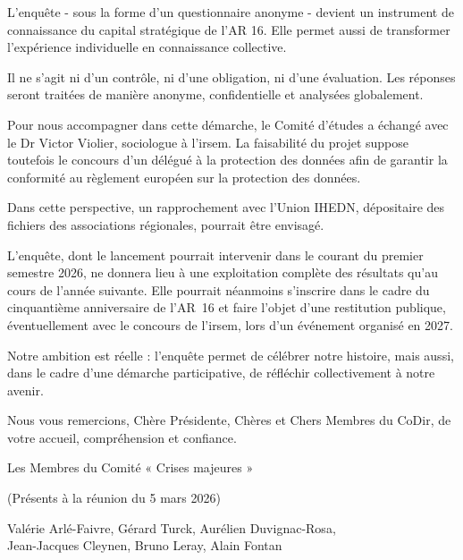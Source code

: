 \begin{tcolorbox}[
breakable,
colback=gray!5,
colframe=black,
boxrule=0.5pt,
arc=3mm
]
L'enquête - sous la forme d'un questionnaire anonyme - devient un instrument de connaissance du capital stratégique de l'AR 16. Elle permet aussi de transformer l'expérience individuelle en connaissance collective.

Il ne s'agit ni d'un contrôle, ni d'une obligation, ni d'une évaluation. Les réponses seront traitées de manière anonyme, confidentielle et analysées globalement.

Pour nous accompagner dans cette démarche, le Comité d'études a échangé avec le Dr Victor Violier, sociologue à l'\gls{irsem}. La faisabilité du projet suppose toutefois le concours d'un délégué à la protection des données afin de garantir la conformité au règlement européen sur la protection des données.

Dans cette perspective, un rapprochement avec l'Union IHEDN, dépositaire des fichiers des associations régionales, pourrait être envisagé.

L'enquête, dont le lancement pourrait intervenir dans le courant du premier semestre 2026, ne donnera lieu à une exploitation complète des résultats qu'au cours de l'année suivante. Elle pourrait néanmoins s'inscrire dans le cadre du cinquantième anniversaire de l'AR~16 et faire l'objet d'une restitution publique, éventuellement avec le concours de l'\gls{irsem}, lors d'un événement organisé en 2027.

Notre ambition est réelle : l'enquête permet de célébrer notre histoire, mais aussi, dans le cadre d'une démarche participative, de réfléchir collectivement à notre avenir.

Nous vous remercions, Chère Présidente, Chères et Chers Membres du CoDir, de votre accueil, compréhension et confiance.

\begin{flushright}
Les Membres du Comité « Crises majeures »

(Présents à la réunion du 5 mars 2026)

Valérie Arlé-Faivre, Gérard Turck, Aurélien Duvignac-Rosa,\\
Jean-Jacques Cleynen, Bruno Leray, Alain Fontan
\end{flushright}

\end{tcolorbox}